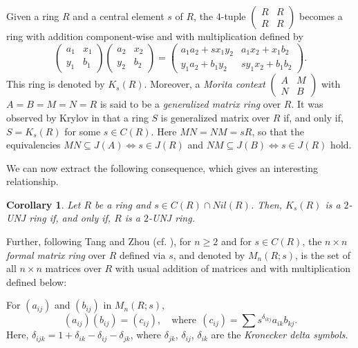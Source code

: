 \documentclass[12pt]{amsart}
\newtheorem{corollary}[theorem]{Corollary}
\theoremstyle{definition}
\begin{document}
Given a ring $R$ and a central element $s$ of $R$, the $4$-tuple $\begin{pmatrix}
	R & R\\
	R & R
\end{pmatrix}$ becomes a ring with addition component-wise and with multiplication defined by
$$\begin{pmatrix}
	a_{1} & x_{1}\\
	y_{1} & b_{1}
\end{pmatrix}\begin{pmatrix}
	a_{2} & x_{2}\\
	y_{2} & b_{2}
\end{pmatrix}=\begin{pmatrix}
	a_{1}a_{2}+sx_{1}y_{2} & a_{1}x_{2}+x_{1}b_{2} \\
	y_{1}a_{2}+b_{1}y_{2} & sy_{1}x_{2}+b_{1}b_{2}
\end{pmatrix}.$$
This ring is denoted by $K_s(R)$. Moreover, a {\it Morita context}
$\begin{pmatrix}
	A & M\\
	N & B
\end{pmatrix}$ with $A=B=M=N=R$ is said to be a {\it generalized matrix ring} over $R$. It was observed by Krylov in \cite{18} that a ring $S$ is generalized matrix over $R$ if, and only if, $S=K_s(R)$ for some $s\in C(R)$. Here $MN=NM=sR$, so that the equivalencies $MN\subseteq J(A)\Longleftrightarrow s\in J(R)$ and $NM\subseteq J(B)\Longleftrightarrow s\in J(R)$ hold.

\medskip

We can now extract the following consequence, which gives an interesting relationship.

\begin{corollary}\label{4.9}
Let $R$ be a ring and $s\in C(R)\cap Nil(R)$. Then, $K_s(R)$ is a $2$-UNJ ring if, and only if, $R$ is a $2$-UNJ ring.
\end{corollary}

Further, following Tang and Zhou (cf. \cite{19}), for $n\geq 2$ and for $s\in C(R)$, the $n\times n$ {\it formal matrix ring} over $R$ defined via $s$, and denoted by $M_{n}(R;s)$, is the set of all $n\times n$ matrices over $R$ with usual addition of matrices and with multiplication defined below:

\medskip

\noindent For $(a_{ij})$ and $(b_{ij})$ in $M_{n}(R;s)$,
$$(a_{ij})(b_{ij})=(c_{ij}), \quad \text{where} ~~ (c_{ij})=\sum s^{\delta_{ikj}}a_{ik}b_{kj}.$$
Here, $\delta_{ijk}=1+\delta_{ik}-\delta_{ij}-\delta_{jk}$, where $\delta_{jk}$, $\delta_{ij}$, $\delta_{ik}$ are the {\it Kronecker delta symbols}.
\end{document}
